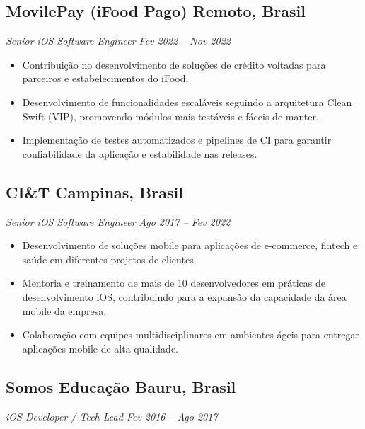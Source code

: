\documentclass[a4paper,10pt]{article}
\begin{document}
\subsection*{\textbf{MovilePay (iFood Pago)} \hfill Remoto, Brasil}
\textit{Senior iOS Software Engineer \hfill Fev 2022 – Nov 2022}

\begin{itemize}

\item Contribuição no desenvolvimento de soluções de crédito voltadas para parceiros e estabelecimentos do iFood.

\item Desenvolvimento de funcionalidades escaláveis seguindo a arquitetura Clean Swift (VIP), promovendo módulos mais testáveis e fáceis de manter.

\item Implementação de testes automatizados e pipelines de CI para garantir confiabilidade da aplicação e estabilidade nas releases.

\end{itemize}

\subsection*{\textbf{CI\&T} \hfill Campinas, Brasil}
\textit{Senior iOS Software Engineer \hfill Ago 2017 – Fev 2022}

\begin{itemize}

\item Desenvolvimento de soluções mobile para aplicações de e-commerce, fintech e saúde em diferentes projetos de clientes.

\item Mentoria e treinamento de mais de 10 desenvolvedores em práticas de desenvolvimento iOS, contribuindo para a expansão da capacidade da área mobile da empresa.

\item Colaboração com equipes multidisciplinares em ambientes ágeis para entregar aplicações mobile de alta qualidade.

\end{itemize}

\subsection*{\textbf{Somos Educação} \hfill Bauru, Brasil}
\textit{iOS Developer / Tech Lead \hfill Fev 2016 – Ago 2017}
\end{document}
